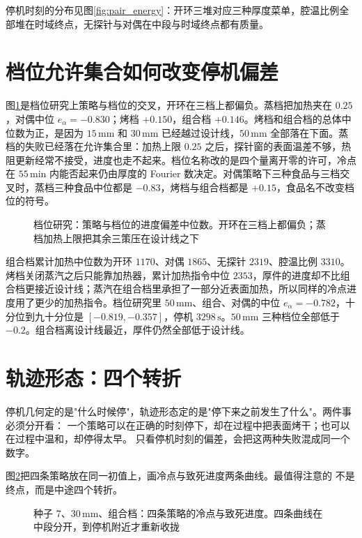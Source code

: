 停机时刻的分布见图\ref{fig:pair_energy}：开环三堆对应三种厚度菜单，腔温比例全部堆在时域终点，无探针与对偶在中段与时域终点都有质量。

\section{档位允许集合如何改变停机偏差}

图\ref{fig:cross}{}是档位研究上策略与档位的交叉，开环在三档上都偏负。蒸档把加热夹在 \(0.25\)，对偶中位 \(e_{\alpha}=-0.830\)；烤档 \(+0.150\)，组合档 \(+0.146\)。烤档和组合档的总体中位数为正，是因为 \(15\,\mathrm{mm}\) 和 \(30\,\mathrm{mm}\) 已经越过设计线，\(50\,\mathrm{mm}\) 全部落在下面。蒸档的失败已经落在允许集合里：加热上限 \(0.25\) 之后，探针窗的表面温差不够，热阻更新经常不接受，进度也走不起来。档位名称改的是四个量离开零的许可，冷点在 \(55\,\mathrm{min}\) 内能否起来仍由厚度的 Fourier 数决定。对偶策略下三种食品与三档交叉时，蒸档三种食品中位都是 \(-0.83\)，烤档与组合档都是 \(+0.15\)，食品名不改变档位的符号。

\begin{figure}[htbp]
\centering
{}
\caption{档位研究：策略与档位的进度偏差中位数。开环在三档上都偏负；蒸档加热上限把其余三策压在设计线之下}
\label{fig:cross}
\end{figure}

组合档累计加热中位数为开环 \(1170\)、对偶 \(1865\)、无探针 \(2319\)、腔温比例 \(3310\)。烤档关闭蒸汽之后只能靠加热器，累计加热指令中位 \(2353\)，厚件的进度却不比组合档更接近设计线；蒸汽在组合档里承担了一部分近表面加热，所以同样的冷点进度用了更少的加热指令。档位研究里 \(50\,\mathrm{mm}\)、组合、对偶的中位 \(e_{\alpha}=-0.782\)，十分位到九十分位是 \([-0.819,-0.357]\)，停机 \(3298\,\mathrm{s}\)。\(50\,\mathrm{mm}\) 三种档位全部低于 \(-0.2\)。组合档离设计线最近，厚件仍然全部低于设计线。

\section{轨迹形态：四个转折}
\label{sec:trace}

停机几何定的是"什么时候停"，轨迹形态定的是"停下来之前发生了什么"。两件事必须分开看：
一个策略可以在正确的时刻停下，却在过程中把表面烤干；也可以在过程中温和，却停得太早。
只看停机时刻的偏差，会把这两种失败混成同一个数字。

图\ref{fig:trpol}{}把四条策略放在同一初值上，画冷点与致死进度两条曲线。最值得注意的
不是终点，而是中途四个转折。

\begin{figure}[t]
\centering
{}
\caption{种子 7、\(30\,\mathrm{mm}\)、组合档：四条策略的冷点与致死进度。四条曲线在中段分开，到停机附近才重新收拢}
\label{fig:trpol}
\end{figure}

